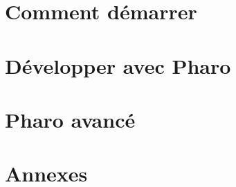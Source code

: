 \documentclass[a4paper,10pt,twoside]{book}
\begin{document}
\vfill
\pagestyle{newheadings}
\tableofcontents
\sloppy %

\mainmatter
\part{Comment démarrer}
\pagestyle{headings}




\part{D\'evelopper avec Pharo}







\part{Pharo avanc\'e}


\appendix
\part{Annexes}

\pagestyle{newheadings}


\cleardoublepage
{\small\raggedright\printindex}
\newcommand{\pagefinale}{\cleardoublepage\thispagestyle{empty}
~ %
}
\pagefinale %
\cleardoublepage
\end{document}
